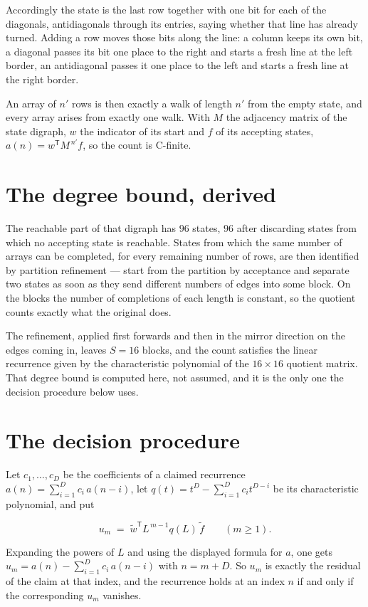 \documentclass[11pt]{article}
\theoremstyle{definition}
\begin{document}
Accordingly the state is the last row together with one bit for each of the diagonals, antidiagonals through its entries, saying whether that line has already turned. Adding a row moves those bits along the line: a column keeps its own bit, a diagonal passes its bit one place to the right and starts a fresh line at the left border, an antidiagonal passes it one place to the left and starts a fresh line at the right border.

An array of $n'$ rows is then exactly a walk of length $n'$ from the empty state, and every array arises from exactly one walk. With $M$ the adjacency matrix of the state digraph, $w$ the indicator of its start and $f$ of its accepting states, $a(n) = w^{\mathsf T}M^{\,n'}f$, so the count is C-finite.

\section{The degree bound, derived}

The reachable part of that digraph has $96$ states, $96$ after discarding states from which no accepting state is reachable. States from which the same number of arrays can be completed, for every remaining number of rows, are then identified by partition refinement --- start from the partition by acceptance and separate two states as soon as they send different numbers of edges into some block. On the blocks the number of completions of each length is constant, so the quotient counts exactly what the original does.

The refinement, applied first forwards and then in the mirror direction on the edges coming in, leaves $S = 16$ blocks, and the count satisfies the linear recurrence given by the characteristic polynomial of the $16 \times 16$ quotient matrix. That degree bound is computed here, not assumed, and it is the only one the decision procedure below uses.

\section{The decision procedure}

Let $c_1,\dots,c_D$ be the coefficients of a claimed recurrence $a(n) = \sum_{i=1}^{D} c_i\,a(n-i)$, let $q(t) = t^{D} - \sum_{i=1}^{D} c_i t^{D-i}$ be its characteristic polynomial, and put

\[u_m \;=\; \tilde w^{\mathsf T} L^{\,m-1} q(L)\,\tilde f \qquad (m \ge 1).\]

Expanding the powers of $L$ and using the displayed formula for $a$, one gets $u_m = a(n) - \sum_{i=1}^{D} c_i\,a(n-i)$ with $n = m + D$. So $u_m$ is exactly the residual of the claim at that index, and the recurrence holds at an index $n$ if and only if the corresponding $u_m$ vanishes.
\end{document}
